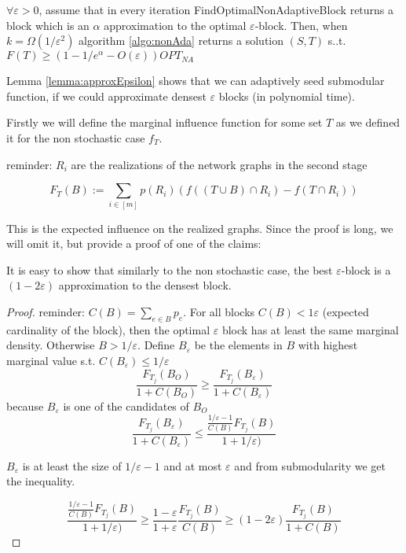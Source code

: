 \begin{lemma} \label{lemma:approxEpsilon}
$\forall \varepsilon >0$, assume that in every iteration FindOptimalNonAdaptiveBlock returns 
a block which is an $\alpha$ approximation to the optimal $\varepsilon$-block. Then, when $k=\Omega(1/\varepsilon^2)$ algorithm \ref{algo:nonAda} returns a solution $(S,T)$ s..t. $F(T)\ge (1-1/e^{\alpha}-O(\varepsilon))OPT_{NA}$
\end{lemma}

Lemma \ref{lemma:approxEpsilon} shows that we can adaptively seed submodular function,  if we could approximate densest $\varepsilon$ blocks (in polynomial time). 

Firstly we will define the marginal influence function for some set $T$ as we defined it for the non stochastic case $f_T$.

reminder: $R_i$ are the realizations of the network graphs in the second stage

$$F_T(B):=\sum_{i\in [m]}{p(R_i)(f((T\cup B)\cap R_i)-f(T\cap R_i))}$$

This is the expected influence on the realized graphs.
Since the proof is long, we will omit it, but provide a proof of one of the claims:
\begin{claim}
It is easy to show that similarly to the non stochastic case, the best $\varepsilon$-block is a $(1-2\varepsilon)$ approximation to the densest block. 
\end{claim}

\begin{proof}

reminder: $C(B)=\sum_{e\in B}p_e$. For all blocks $C(B)<1\varepsilon$ (expected cardinality of the block), then the optimal $\varepsilon$ block has at least the same marginal density.
Otherwise $B>1/\varepsilon$.
Define $B_{\varepsilon}$ be the elements in $B$ with highest marginal value s.t. $C(B_{\varepsilon})\le 1/\varepsilon$
$$\frac{F_{T_j}(B_O)}{1+C(B_O)}\ge\frac{F_{T_j}(B_{\varepsilon})}{1+C(B_{\varepsilon})}$$
because $B_{\varepsilon}$ is one of the candidates of $B_O$
$$\frac{F_{T_j}(B_{\varepsilon})}{1+C(B_{\varepsilon})}\le \frac{\frac{1/\varepsilon-1}{C(B)}F_{T_j}(B)}{1+1/\varepsilon)}$$

$B_{\varepsilon}$ is at least the size of $1/\varepsilon-1$  and at most $\varepsilon$ and from submodularity we get the inequality.

$$\frac{\frac{1/\varepsilon-1}{C(B)}F_{T_j}(B)}{1+1/\varepsilon)}\ge
 \frac{1-\varepsilon}{1+\varepsilon}\frac{F_{T_j}(B)}{C(B)}\ge(1-2\varepsilon)\frac{F_{T_j}(B)}{1+C(B)}$$

\end{proof}

